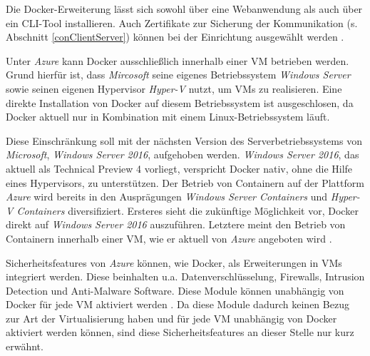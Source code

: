 \documentclass[../main.tex]{subfiles}
\begin{document}
      Die Docker-Erweiterung lässt sich sowohl über eine Webanwendung als auch über ein CLI-Tool installieren. Auch Zertifikate zur Sicherung der Kommunikation (s. Abschnitt \ref{conClientServer}) können bei der Einrichtung ausgewählt werden \cite{azureDockerExtension}\cite{azureDockerExtensionCLI}.

      Unter \emph{Azure} kann Docker ausschließlich innerhalb einer VM betrieben werden. Grund hierfür ist, dass \emph{Mircosoft} seine eigenes Betriebssystem \emph{Windows Server} sowie seinen eigenen Hypervisor \emph{Hyper-V} nutzt, um VMs zu realisieren. Eine direkte Installation von Docker auf diesem Betriebssystem ist ausgeschlosen, da Docker aktuell nur in Kombination mit einem Linux-Betriebssystem läuft.

      Diese Einschränkung soll mit der nächsten Version des Serverbetriebssystems von \emph{Microsoft}, \emph{Windows Server 2016}, aufgehoben werden. \emph{Windows Server 2016}, das aktuell als Technical Preview 4 vorliegt, verspricht Docker nativ, ohne die Hilfe eines Hypervisors, zu unterstützen. Der Betrieb von Containern auf der Plattform \emph{Azure} wird bereits in den Ausprägungen \emph{Windows Server Containers} und \emph{Hyper-V Containers} diversifiziert. Ersteres sieht die zukünftige Möglichkeit vor, Docker direkt auf \emph{Windows Server 2016} auszuführen. Letztere meint den Betrieb von Containern innerhalb einer VM, wie er aktuell von \emph{Azure} angeboten wird \cite{dockerPartnershipMicrosoft}\cite{azureWindowsContainers}.


      Sicherheitsfeatures von \emph{Azure} können, wie Docker, als Erweiterungen in VMs integriert werden. Diese beinhalten u.a. Datenverschlüsselung, Firewalls, Intrusion Detection und Anti-Malware Software. Diese Module können unabhängig von Docker für jede VM aktiviert werden \cite{azureDockerExtensionSecurity}. Da diese Module dadurch keinen Bezug zur Art der Virtualisierung haben und für jede VM unabhängig von Docker aktiviert werden können, sind diese Sicherheitsfeatures an dieser Stelle nur kurz erwähnt.
\end{document}
